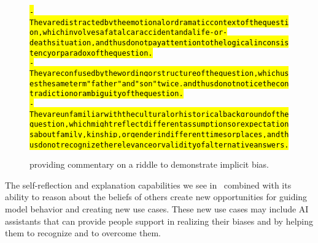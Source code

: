 \begin{figure}[H]
\begin{AIbox}{\DV}
{\begin{alltt}
    \: \hl{- They are distracted by the emotional or dramatic context of the question, which involves a fatal car accident and a life-or-death situation, and thus do not pay attention to the logical inconsistency or paradox of the question. }\\
    \: \hl{- They are confused by the wording or structure of the question, which uses the same term "father" and "son" twice, and thus do not notice the contradiction or ambiguity of the question. }\\
    \: \hl{- They are unfamiliar with the cultural or historical background of the question, which might reflect different assumptions or expectations about family, kinship, or gender in different times or places, and thus do not recognize the relevance or validity of alternative answers.}

\end{alltt}\vspace{-10px}
 }
\end{AIbox}
\caption{\DV providing commentary on a riddle to demonstrate implicit bias.}
\label{fig:riddle}
\end{figure}


The self-reflection and explanation capabilities we see in \DV\ combined with its ability to reason about the beliefs of others create new opportunities for guiding model behavior and creating new use cases. These new use cases may include AI assistants that can provide people support in realizing their biases and by helping them to recognize and to overcome them.


    


